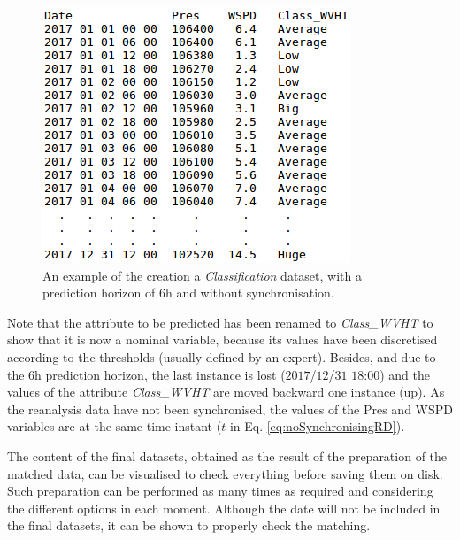 \documentclass[energies,article,submit,moreauthors,pdftex]{Definitions/mdpi}
\begin{document}
\begin{itemize}
							
						\begin{figure}[ht!]
							\centering
							\includegraphics[scale=0.6]{figures/FigureClassification.png}
							\caption{An example of the creation a \textit{Classification} dataset, with a prediction horizon of $6$h and without synchronisation.}
							\label{fig:prediction}
						\end{figure}
						
						Note that the attribute to be predicted has been renamed to \textit{Class\_WVHT} to show that it is now a nominal variable, because its values have been discretised according to the thresholds (usually defined by an expert). Besides, and due to the $6$h prediction horizon, the last instance is lost ($2017$/$12$/$31$ $18$:$00$) and the values of the attribute \textit{Class\_WVHT} are moved backward one instance (up). As the reanalysis data have not been synchronised, the values of the Pres and WSPD variables are at the same time instant ($t$ in Eq. \ref{eq:noSynchronisingRD}).
						
					\end{itemize}
				
				The content of the final datasets, obtained as the result of the preparation of the matched data, can be visualised to check everything before saving them on disk. Such preparation can be performed as many times as required and considering the different options in each moment. Although the date will not be included in the final datasets, it can be shown to properly check the matching.
				
\end{document}
